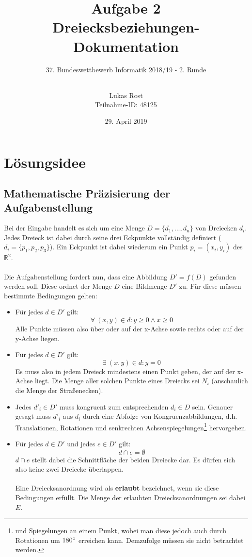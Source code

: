 \documentclass[a4paper, notitlepage, 12pt,headinclude]{scrartcl}
\author{Lukas Rost \\ \small{Teilnahme-ID: 48125}}
\title{Aufgabe 2 \\ \glqq Dreiecksbeziehungen\grqq  - Dokumentation}
\subtitle{37. Bundeswettbewerb Informatik 2018/19 - 2. Runde \\~\\}
\date{29. April 2019}
\begin{document}
\renewcommand{\contentsname}{\centerline{Inhaltsverzeichnis}}
 \maketitle
 \tableofcontents
 \thispagestyle{empty}
 \newpage
 \setcounter{page}{1}
 
 \section{Lösungsidee}
 \subsection{Mathematische Präzisierung der Aufgabenstellung}
 Bei der Eingabe handelt es sich um eine Menge $D = \{d_1,...,d_n\}$ von Dreiecken $d_i$. Jedes Dreieck ist dabei durch seine drei Eckpunkte vollständig definiert ($d_i = \{p_1,p_2,p_3\}$). Ein Eckpunkt ist dabei wiederum ein Punkt $p_i = (x_i,y_i)$ des $\mathbb{R}^2$. \\ \\
 Die Aufgabenstellung fordert nun, dass eine Abbildung $D' = f(D)$ gefunden werden soll. Diese ordnet der Menge $D$ eine Bildmenge $D'$ zu. Für diese müssen bestimmte Bedingungen gelten:
 \begin{itemize}
 	\item Für jedes $d \in D'$ gilt:
 	\begin{equation}
 	\forall ~(x,y) \in d: y \geq 0 \wedge x \geq 0
 	\end{equation}
 	Alle Punkte müssen also über oder auf der x-Achse sowie rechts oder auf der y-Achse liegen.
 	\item Für jedes $d \in D'$ gilt:
 	\begin{equation}
 	\exists ~(x,y) \in d: y = 0
 	\end{equation}
 	Es muss also in jedem Dreieck mindestens einen Punkt geben, der auf der x-Achse liegt. Die Menge aller solchen Punkte eines Dreiecks sei $N_i$ (anschaulich die Menge der Straßenecken). 	
 	\item Jedes $d'_i \in D'$ muss kongruent zum entsprechenden $d_i \in D$ sein. Genauer gesagt muss $d'_i$ aus $d_i$ durch eine Abfolge von Kongruenzabbildungen, d.h. Translationen, Rotationen und senkrechten Achsenspiegelungen\footnote{ und Spiegelungen an einem Punkt, wobei man diese jedoch auch durch Rotationen um $180\degree$ erreichen kann. Demzufolge müssen sie nicht betrachtet werden.} hervorgehen.
 	\item Für jedes $d \in D'$ und jedes $e \in D'$ gilt:
 	\begin{equation}
 	d \cap e = \emptyset
 	\end{equation}
 	$d \cap e$ stellt dabei die Schnittfläche der beiden Dreiecke dar. Es dürfen sich also keine zwei Dreiecke überlappen.\\ \\
 	Eine Dreiecksanordnung wird als \textbf{erlaubt} bezeichnet, wenn sie diese Bedingungen erfüllt. Die Menge der erlaubten Dreiecksanordnungen sei dabei $E$.
  \end{itemize}
\end{document}
